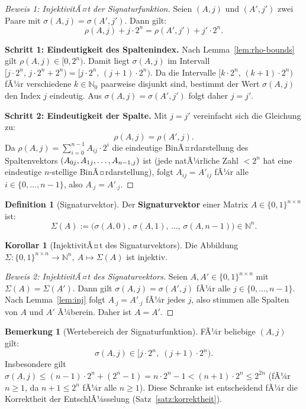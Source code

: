 ﻿\documentclass[a4paper,12pt]{scrreprt}
\theoremstyle{definition}
\newtheorem{definition}{Definition}[section]
\newtheorem{bemerkung}{Bemerkung}[section]
\newtheorem{korollar}{Korollar}[section]
\begin{document}
\begin{proof}[Beweis 1: InjektivitÃ¤t der Signaturfunktion]
	Seien $(A, j)$ und $(A', j')$ zwei Paare mit $\sigma(A,j) = \sigma(A',j')$. Dann gilt:
	\[
	\rho(A,j) + j \cdot 2^n = \rho(A',j') + j' \cdot 2^n.
	\]
	
	\textbf{Schritt 1: Eindeutigkeit des Spaltenindex.}
	Nach Lemma~\ref{lem:rho-bounds} gilt $\rho(A,j) \in [0, 2^n)$. Damit liegt $\sigma(A,j)$ im Intervall $[j \cdot 2^n,\, j \cdot 2^n + 2^n) = [j \cdot 2^n,\, (j+1) \cdot 2^n)$. Da die Intervalle $[k \cdot 2^n,\, (k+1) \cdot 2^n)$ fÃ¼r verschiedene $k \in \mathbb{N}_0$ paarweise disjunkt sind, bestimmt der Wert $\sigma(A,j)$ den Index $j$ eindeutig. Aus $\sigma(A,j) = \sigma(A',j')$ folgt daher $j = j'$.
	
	\textbf{Schritt 2: Eindeutigkeit der Spalte.}
	Mit $j = j'$ vereinfacht sich die Gleichung zu:
	\[
	\rho(A,j) = \rho(A',j).
	\]
	Da $\rho(A,j) = \sum_{i=0}^{n-1} A_{ij} \cdot 2^i$ die eindeutige BinÃ¤rdarstellung des Spaltenvektors $(A_{0j}, A_{1j}, \ldots, \newline A_{n-1,j})$ ist (jede natÃ¼rliche Zahl $< 2^n$ hat eine eindeutige $n$-stellige BinÃ¤rdarstellung), folgt $A_{ij} = A'_{ij}$ fÃ¼r alle $i \in \{0,\ldots,n-1\}$, also $A_{\cdot j} = A'_{\cdot j}$.
\end{proof}

\begin{definition}[Signaturvektor]
	\label{def:sigvec}
	Der \textbf{Signaturvektor} einer Matrix $A \in \{0,1\}^{n \times n}$ ist:
	\[
	\Sigma(A) := \bigl(\sigma(A,0),\, \sigma(A,1),\, \ldots,\, \sigma(A,n-1)\bigr) \in \mathbb{N}^n.
	\]
\end{definition}

\begin{korollar}[InjektivitÃ¤t des Signaturvektors]
	\label{kor:sigma-inj}
	Die Abbildung $\Sigma: \{0,1\}^{n \times n} \to \mathbb{N}^n,\ A \mapsto \Sigma(A)$ ist injektiv.
\end{korollar}

\begin{proof}[Beweis 2: InjektivitÃ¤t des Signaturvektors]
	Seien $A, A' \in \{0,1\}^{n \times n}$ mit $\Sigma(A) = \Sigma(A')$. Dann gilt $\sigma(A,j) = \sigma(A',j)$ fÃ¼r alle $j \in \{0,\ldots,n-1\}$. Nach Lemma~\ref{lem:inj} folgt $A_{\cdot j} = A'_{\cdot j}$ fÃ¼r jedes $j$, also stimmen alle Spalten von $A$ und $A'$ Ã¼berein. Daher ist $A = A'$.
\end{proof}

\begin{bemerkung}[Wertebereich der Signaturfunktion]
	\label{bem:wertebereich}
	FÃ¼r beliebige $(A,j)$ gilt:
	\[
	\sigma(A,j) \in [j \cdot 2^n,\; (j+1) \cdot 2^n).
	\]
	Insbesondere gilt $\sigma(A,j) \leq (n-1) \cdot 2^n + (2^n - 1) = n \cdot 2^n - 1 < (n+1) \cdot 2^n \leq 2^{2n}$
	(fÃ¼r $n \geq 1$, da $n+1 \leq 2^n$ fÃ¼r alle $n \geq 1$). Diese Schranke ist entscheidend fÃ¼r die Korrektheit der EntschlÃ¼sselung (Satz~\ref{satz:korrektheit}).
\end{bemerkung}
\end{document}
